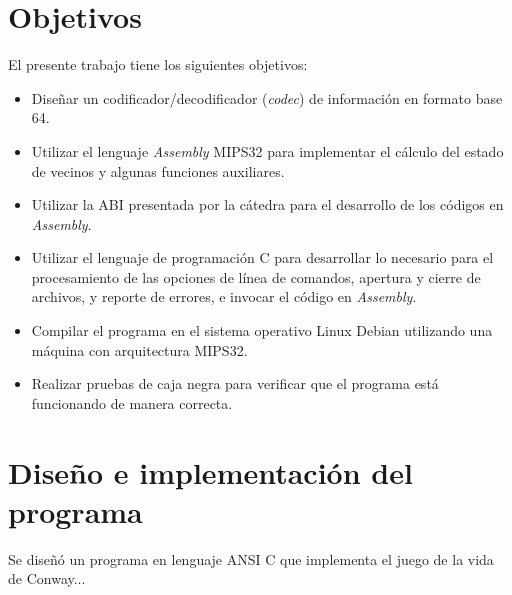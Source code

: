 \section{Objetivos}
El presente trabajo tiene los siguientes objetivos:
\begin{itemize}
    \item Diseñar un codificador/decodificador (\emph{codec}) de información en formato base 64.
    \item Utilizar el lenguaje \textit{Assembly} MIPS32 para implementar el cálculo del estado de vecinos y algunas funciones auxiliares.
    \item Utilizar la ABI presentada por la cátedra para el desarrollo de los códigos en \textit{Assembly}.
    \item Utilizar el lenguaje de programación C para desarrollar lo necesario para el procesamiento de las opciones de línea de comandos, apertura y cierre de archivos, y reporte de errores, e invocar el código en \textit{Assembly}.
    \item Compilar el programa en el sistema operativo Linux Debian utilizando una máquina con arquitectura MIPS32.
    \item Realizar pruebas de caja negra para verificar que el programa está funcionando de manera correcta.
\end{itemize}
\section{Diseño e implementación del programa}

Se diseñó un programa en lenguaje ANSI C que implementa el juego de la vida de Conway...

